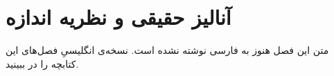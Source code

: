 \chapter{آنالیز حقیقی و نظریه اندازه}
\label{ch:07-real-analysis-and-measure-theory-fa-01}

متن این فصل هنوز به فارسی نوشته نشده است. نسخه‌ی انگلیسیِ فصل‌های این کتابچه را در  ببینید.
